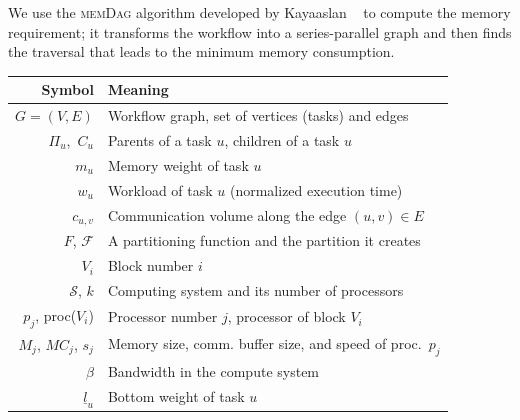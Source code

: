 \documentclass[conference]{IEEEtran}
\newcommand{\algo}[1]{\textsc{#1}}
\newcommand{\bottomlevel}[1]{\underline{l}_{#1}} %
\newcommand{\parents}[1]{\,\Pi_{#1}}
\newcommand{\children}[1]{\,C_{#1}}
\newcommand{\cluster}{\,\mathcal{S}}
\begin{document}
    We use the \algo{memDag} algorithm developed by Kayaaslan \etal~\cite{KAYAASLAN20181} to compute
    the memory requirement; it transforms the workflow into a series-parallel graph
    and then finds the traversal that leads to the minimum memory consumption.

    \begin{table}[h]
        \begin{center}
            \begin{tabular}{rl}
                \hline
                \textbf{Symbol}                       & \textbf{Meaning}                                         \\
                \hline
                $G = (V, E)$                          & Workflow graph, set of vertices (tasks) and edges        \\
                $\parents{u}$, $\children{u}$         & Parents of a task $u$, children of a task $u$            \\
                $m_u$                                 & Memory weight of task $u$                                \\
                $w_u$                                 & Workload of task $u$  (normalized execution time)          \\
                $c_{u,v}$                             & Communication volume along the edge $(u,v)\in E$         \\
                $F$, $\mathcal{F}$                    & A partitioning function and the partition it creates     \\
                $V_i$                                 & Block number $i$                                         \\ %
                $\cluster$, $k$                    & Computing system and its number of processors           \\
                $p_j$, proc($V_i$)                          & Processor number $j$, processor of block $V_i$                 \\
                $M_j$, $MC_j$, $s_j$                               & Memory size, comm. buffer size, and speed of proc.\ $p_j$                          \\
                $\beta$                     & Bandwidth in the compute system                                \\
                $\bottomlevel{u}$                      & Bottom weight of task $u$ \\

\end{tabular}
\end{center}
\end{table}
\end{document}
